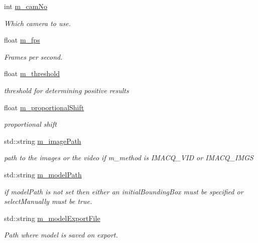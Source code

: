 \begin{DoxyCompactItemize}
int \hyperlink{classtld_1_1Settings_a01db1115a98b15abdab2c03cdacadfdd}{m\-\_\-cam\-No}
\begin{DoxyCompactList}\small\item\em Which camera to use. \end{DoxyCompactList}\item 
float \hyperlink{classtld_1_1Settings_aaa119898fb2f14ce2eed7fc861733eac}{m\-\_\-fps}
\begin{DoxyCompactList}\small\item\em Frames per second. \end{DoxyCompactList}\item 
float \hyperlink{classtld_1_1Settings_afc2357da344888ad2158cbb51f8eb377}{m\-\_\-threshold}
\begin{DoxyCompactList}\small\item\em threshold for determining positive results \end{DoxyCompactList}\item 
float \hyperlink{classtld_1_1Settings_afcb52ecca38e4e236a66c3f36ec7cdbf}{m\-\_\-proportional\-Shift}
\begin{DoxyCompactList}\small\item\em proportional shift \end{DoxyCompactList}\item 
std\-::string \hyperlink{classtld_1_1Settings_abfd40dee05d0005e6cdaab2e0a84a4a9}{m\-\_\-image\-Path}
\begin{DoxyCompactList}\small\item\em path to the images or the video if m\-\_\-method is I\-M\-A\-C\-Q\-\_\-\-V\-I\-D or I\-M\-A\-C\-Q\-\_\-\-I\-M\-G\-S \end{DoxyCompactList}\item 
std\-::string \hyperlink{classtld_1_1Settings_ac09a844a6ee9727f04e2de086f4fa9ce}{m\-\_\-model\-Path}
\begin{DoxyCompactList}\small\item\em if model\-Path is not set then either an initial\-Bounding\-Box must be specified or select\-Manually must be true. \end{DoxyCompactList}\item 
std\-::string \hyperlink{classtld_1_1Settings_a2fb70f5b39e773b64d62f902009827fc}{m\-\_\-model\-Export\-File}
\begin{DoxyCompactList}\small\item\em Path where model is saved on export. \end{DoxyCompactList}\item 

\end{DoxyCompactItemize}

